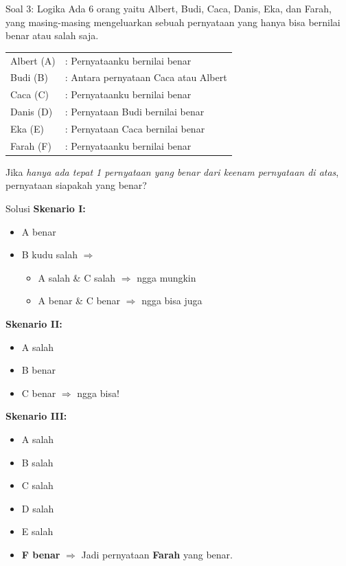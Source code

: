 \documentclass[english,t]{beamer}
\begin{document}
\begin{frame}{Soal 3: Logika}
Ada 6 orang yaitu Albert, Budi, Caca, Danis, Eka, dan Farah, yang masing-masing mengeluarkan sebuah pernyataan yang hanya bisa bernilai benar atau salah saja.

\bigskip
\begin{tabular}{ll}
Albert (A) &: Pernyataanku bernilai benar \\
Budi (B)   &: Antara pernyataan Caca atau Albert \\
Caca (C)   &: Pernyataanku bernilai benar \\
Danis (D)  &: Pernyataan Budi bernilai benar \\
Eka (E)    &: Pernyataan Caca bernilai benar \\
Farah (F)  &: Pernyataanku bernilai benar
\end{tabular} 

\bigskip
Jika \textit{hanya ada tepat 1 pernyataan yang benar dari keenam pernyataan di atas}, pernyataan siapakah yang benar?
\end{frame}

\begin{frame}{Solusi}
\textbf{Skenario I:}\\
\begin{itemize}
	\item A benar
	\item B kudu salah $\Rightarrow$
	\begin{itemize}
		\item A salah \& C salah $\Rightarrow$ ngga mungkin 
		\item A benar \& C benar $\Rightarrow$ ngga bisa juga 
	\end{itemize}
\end{itemize}

\textbf{Skenario II:}\\
\begin{itemize}
	\item A salah
	\item B benar
	\item C benar $\Rightarrow$ ngga bisa!
\end{itemize}

\textbf{Skenario III:}\\
\begin{itemize}
	\item A salah
	\item B salah
	\item C salah
	\item D salah
	\item E salah
	\item \textbf{F benar} $\Rightarrow$ Jadi pernyataan \textbf{Farah} yang benar.
\end{itemize}
\end{frame}
\end{document}
